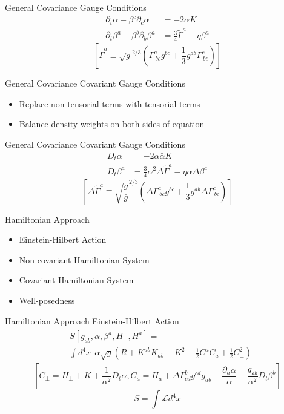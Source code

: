 \documentclass[xcolor=dvipsnames]{beamer}
\begin{document}
	\begin{frame}{General Covariance}
		Gauge Conditions
		\pause
		\begin{align*}
			\partial_{t}\alpha - \beta^{c}\partial_{c}\alpha &= -2\alpha K\\
			\partial_{t}\beta^{a} - \beta^{b}\partial_{b}\beta^{a} &=  \frac{3}{4}{\tilde \Gamma}^{a} - \eta \beta^{a}
		\end{align*}
		\tiny
		\[
		\left[{\tilde \Gamma}^{a} \equiv \sqrt{g}^{2/3}\left(\Gamma^{a}_{~bc}g^{bc} + \frac{1}{3}g^{ab}\Gamma^{c}_{~bc}\right)\right]
		\]
	\end{frame}
	\begin{frame}{General Covariance}
		Covariant Gauge Conditions
		\pause
		\begin{itemize}
			\item{Replace non-tensorial terms with tensorial terms}
			\item{Balance density weights on both sides of equation}
		\end{itemize}
	\end{frame}
	\begin{frame}{General Covariance}
		Covariant Gauge Conditions
		\begin{align*}
			D_{t}\alpha &= -2\alpha{\bar \alpha}K\\
			D_{t}\beta^{a} &= \frac{3}{4}{\bar \alpha}^{2}\Delta {\tilde \Gamma}^{a} - \eta {\bar \alpha}\Delta\beta^{a}  
		\end{align*}
		\tiny
		\[
			\left[\Delta {\tilde \Gamma}^{a} \equiv \sqrt{\frac{g}{{\bar g}}}^{2/3}\left(\Delta \Gamma^{a}_{~bc}g^{bc} + \frac{1}{3}g^{ab}\Delta \Gamma^{c}_{~bc}\right)\right]
		\]
	\end{frame}
	\begin{frame}{Hamiltonian Approach}
		\begin{itemize}
			\item{Einstein-Hilbert Action}
			\item{Non-covariant Hamiltonian System}
			\item{Covariant Hamiltonian System}
			\item{Well-posedness}
		\end{itemize}
	\end{frame}
	\begin{frame}{Hamiltonian Approach}
		Einstein-Hilbert Action
		\begin{align*}
			\begin{split}
				&S\left[g_{ab}, \alpha, \beta^{a}, H_{\perp}, H^{a}\right] =\\&\int d^{4}x~~\alpha \sqrt{g} \left( R + K^{ab}K_{ab} - K^{2} - \frac{1}{2}C^{a}C_{a} + \frac{1}{2}C_{\perp}^{2}\right)
			\end{split}
		\end{align*}
		\tiny
		\[		
		\left[ C_{\perp} = H_{\perp} + K + \frac{1}{\alpha^{2}}D_{t}\alpha, C_{a} = H_{a} + \Delta \Gamma^{b}_{cd}g^{cd}g_{ab} - \frac{\partial_{a}\alpha}{\alpha} - \frac{g_{ab}}{\alpha^2}D_{t}\beta^{b} \right]
		\]
		\pause
		\normalsize
		\[
		S = \int\mathscr{L}d^{4}x
		\]
	\end{frame}
\end{document}
